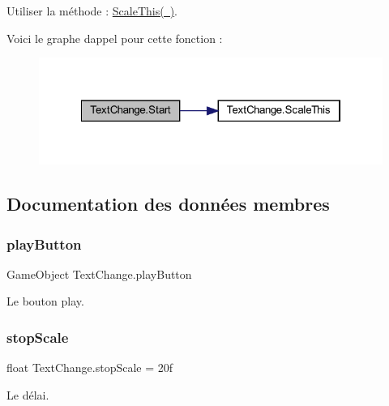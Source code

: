 Utiliser la méthode \+: \mbox{\hyperlink{class_text_change_a4fa76be59683626a930fc35f76a9c203}{Scale\+This( )}}. 

Voici le graphe d\textquotesingle{}appel pour cette fonction \+:
\nopagebreak
\begin{figure}[H]
\begin{center}
\leavevmode
\includegraphics[width=322pt]{class_text_change_a2c9022c92c5bc0756fe5c8196b309b38_cgraph}
\end{center}
\end{figure}


\subsection{Documentation des données membres}
\mbox{\label{class_text_change_a2db3747c923cba0a53f035fc0c536ee2}} 
\subsubsection{\texorpdfstring{play\+Button}{playButton}}
{\footnotesize\ttfamily Game\+Object Text\+Change.\+play\+Button\hspace{0.3cm}{\ttfamily [private]}}



Le bouton play. 

\mbox{\label{class_text_change_a84ee21ec41dff49dfe0afed07f2c6988}} 
\subsubsection{\texorpdfstring{stop\+Scale}{stopScale}}
{\footnotesize\ttfamily float Text\+Change.\+stop\+Scale = 20f\hspace{0.3cm}{\ttfamily [private]}}



Le délai. 


